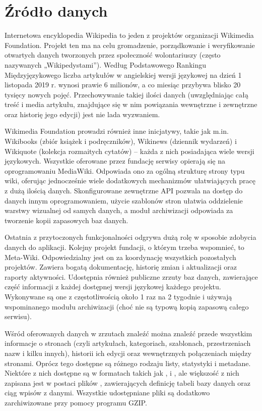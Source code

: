 \section{Źródło danych}
\label{sec:data-source}
Internetowa encyklopedia Wikipedia to jeden z projektów organizacji Wikimedia Foundation. Projekt ten ma na celu gromadzenie, porządkowanie i weryfikowanie otwartych danych tworzonych przez społeczność wolontariuszy (często nazywanych „Wikipedystami”). Według Podstawowego Rankingu Międzyjęzykowego \cite{Wiki:PodstawowyRanking} liczba artykułów w angielskiej wersji językowej na dzień 1 listopada 2019 r. wynosi prawie 6 milionów, a co miesiąc przybywa blisko 20 tysięcy nowych pojęć. Przechowywanie takiej ilości danych (uwzględniając całą treść i media artykułu, znajdujące się w nim powiązania wewnętrzne i zewnętrzne oraz historię jego edycji) jest nie lada wyzwaniem.

Wikimedia Foundation prowadzi również inne inicjatywy, takie jak m.in. Wikibooks (zbiór książek i podręczników), Wikinews (dziennik wydarzeń) i Wikiquote (kolekcja rozmaitych cytatów) – każda z nich posiadająca wiele wersji językowych. Wszystkie oferowane przez fundację serwisy opierają się na oprogramowaniu MediaWiki. Odpowiada ono za ogólną strukturę strony typu wiki, oferując jednocześnie wiele dodatkowych mechanizmów ułatwiających pracę z dużą ilością danych. Skonfigurowane zewnętrzne API pozwala na dostęp do danych innym oprogramowaniem, użycie szablonów stron ułatwia oddzielenie warstwy wizualnej od samych danych, a moduł archiwizacji odpowiada za tworzenie kopii zapasowych baz danych.

Ostatnia z przytoczonych funkcjonalności odgrywa dużą rolę w sposobie zdobycia danych do aplikacji. Kolejny projekt fundacji, o którym trzeba wspomnieć, to Meta-Wiki. Odpowiedzialny jest on za koordynację wszystkich pozostałych projektów. Zawiera bogatą dokumentację, historię zmian i aktualizacji oraz raporty aktywności. Udostępnia również publiczne zrzuty baz danych, zawierające część informacji z każdej dostępnej wersji językowej każdego projektu. Wykonywane są one z częstotliwością około 1 raz na 2 tygodnie i używają wspominanego modułu archiwizacji (choć nie są typową kopią zapasową całego serwisu).

Wśród oferowanych danych w zrzutach znaleźć można znaleźć przede wszystkim informacje o stronach (czyli artykułach, kategoriach, szablonach, przestrzeniach nazw i kilku innych), historii ich edycji oraz wewnętrznych połączeniach między stronami. Oprócz tego dostępne są różnego rodzaju listy, statystyki i metadane. Niektóre z nich dostępne są w formatach takich jak ,  i , ale większość z nich zapisana jest w postaci plików , zawierających definicję tabeli bazy danych oraz ciąg wpisów z danymi. Wszystkie udostępniane pliki są dodatkowo zarchiwizowane przy pomocy programu GZIP.